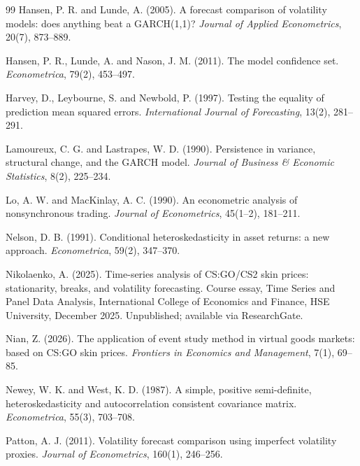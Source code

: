 \documentclass[11pt,a4paper]{article}
\begin{document}
\begin{thebibliography}{99}
Hansen, P. R. and Lunde, A. (2005).
\newblock A forecast comparison of volatility models: does anything beat a
GARCH(1,1)?
\newblock \emph{Journal of Applied Econometrics}, 20(7), 873--889.

Hansen, P. R., Lunde, A. and Nason, J. M. (2011).
\newblock The model confidence set.
\newblock \emph{Econometrica}, 79(2), 453--497.

Harvey, D., Leybourne, S. and Newbold, P. (1997).
\newblock Testing the equality of prediction mean squared errors.
\newblock \emph{International Journal of Forecasting}, 13(2), 281--291.

Lamoureux, C. G. and Lastrapes, W. D. (1990).
\newblock Persistence in variance, structural change, and the GARCH model.
\newblock \emph{Journal of Business \& Economic Statistics}, 8(2), 225--234.

Lo, A. W. and MacKinlay, A. C. (1990).
\newblock An econometric analysis of nonsynchronous trading.
\newblock \emph{Journal of Econometrics}, 45(1--2), 181--211.

Nelson, D. B. (1991).
\newblock Conditional heteroskedasticity in asset returns: a new approach.
\newblock \emph{Econometrica}, 59(2), 347--370.

Nikolaenko, A. (2025).
\newblock Time-series analysis of CS:GO/CS2 skin prices: stationarity, breaks,
and volatility forecasting.
\newblock Course essay, Time Series and Panel Data Analysis, International
College of Economics and Finance, HSE University, December 2025. Unpublished;
available via ResearchGate.

Nian, Z. (2026).
\newblock The application of event study method in virtual goods markets:
based on CS:GO skin prices.
\newblock \emph{Frontiers in Economics and Management}, 7(1), 69--85.

Newey, W. K. and West, K. D. (1987).
\newblock A simple, positive semi-definite, heteroskedasticity and
autocorrelation consistent covariance matrix.
\newblock \emph{Econometrica}, 55(3), 703--708.

Patton, A. J. (2011).
\newblock Volatility forecast comparison using imperfect volatility proxies.
\newblock \emph{Journal of Econometrics}, 160(1), 246--256.


\end{thebibliography}
\end{document}
